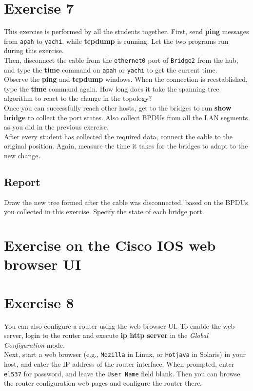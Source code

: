 \documentclass[10pt,a4paper]{article}
\numberwithin{equation}{section}
\numberwithin{figure}{section}
\numberwithin{table}{section}
\begin{document}
    \section{ Exercise 7}
    This exercise is performed by all the students together.
    First, send \textbf{ping} messages from \texttt{apah} to \texttt{yachi}, while \textbf{tcpdump} is running.
    Let the two programs run during this exercise. \\
    Then, disconnect the cable from the \texttt{ethernet0} port of \texttt{Bridge2} from the hub, and type the \textbf{time} command on \texttt{apah} or \texttt{yachi} to get the current time. \\
    Observe the \textbf{ping} and \textbf{tcpdump} windows. When the connection is reestablished, type the \textbf{time} command again. How long does it take the spanning tree algorithm to react to the change in the topology? \\
    Once you can successfully reach other hosts, get to the bridges to run \textbf{show bridge} to collect the port states. Also collect BPDUs from all the LAN segments as you did in the previous exercise. \\
    After every student has collected the required data, connect the cable to the original position. Again, measure the time it takes for the bridges to adapt to the new change.
    \subsection*{Report}
    Draw the new tree formed after the cable was disconnected, based on the BPDUs you collected in this exercise. Specify the state of each bridge port.


    \section*{Exercise on the Cisco IOS web browser UI}
    \section{ Exercise 8}
    You can also configure a router using the web browser UI. To enable the web server, login to the router and execute \textbf{ip http server} in the \textit{Global Configuration} mode. \\
    Next, start a web browser (e.g., \texttt{Mozilla} in Linux, or \texttt{Hotjava} in Solaris) in your host, and enter the IP address of the router interface. When prompted, enter \texttt{el537} for password, and leave the \texttt{User Name} field blank. Then you can browse the router configuration web pages and configure the router there.
\end{document}
